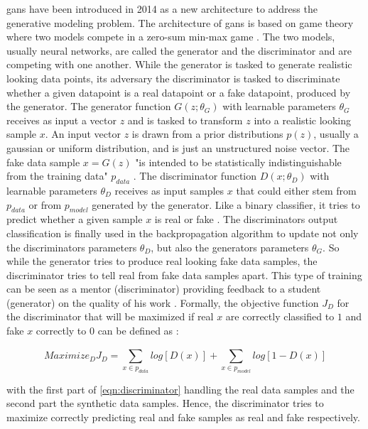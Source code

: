 \Glspl{gan} \cite{NIPS2014_5ca3e9b1} have been introduced in 2014 as a new architecture to address the generative modeling problem.
The architecture of \Glspl{gan} is based on game theory where two \glspl{model} compete in a zero-sum min-max game \cite{NIPS2014_5ca3e9b1, zhao2022CTABGANEnhancingTabular}.
The two \glspl{model}, usually neural networks, are called the generator and the discriminator and are competing with one another.
While the generator is tasked to generate realistic looking data points, its adversary the discriminator is tasked to discriminate whether a given datapoint is a real datapoint or a fake datapoint, produced by the generator.
The generator function $G(z;\theta_G)$ with learnable parameters $\theta_G$ receives as input a vector $z$ and is tasked to transform $z$ into a realistic looking sample $x$.
An input vector $z$ is drawn from a prior distributions $p(z)$, usually a gaussian or uniform distribution, and is just an unstructured noise vector.
The fake data sample $x=G(z)$ "is intended to be statistically indistinguishable from the training data" $p_{data}$ \cite[p. 141]{goodfellow2020GenerativeAdversarialNetworks}.
The discriminator function $D(x;\theta_D)$ with learnable parameters $\theta_D$ receives as input samples $x$ that could either stem from $p_{data}$ or from $p_{model}$ generated by the generator.
Like a binary classifier, it tries to predict whether a given sample $x$ is real or fake \cite{NIPS2014_5ca3e9b1}.
The discriminators output classification is finally used in the backpropagation algorithm to update not only the discriminators parameters $\theta_D$, but also the generators parameters $\theta_G$.
So while the generator tries to produce real looking fake data samples, the discriminator tries to tell real from fake data samples apart. 
This type of training can be seen as a mentor (discriminator) providing feedback to a student (generator) on the quality of his work \cite{zhao2022CTABGANEnhancingTabular}.
Formally, the objective function $J_D$ for the discriminator that will be maximized if real $x$ are correctly classified to $1$ and fake $x$ correctly to $0$ can be defined as \cite{aggarwal2018NeuralNetworksDeep}:

\begin{equation}
    \label{eqn:discriminator}
    Maximize_DJ_D= \sum_{x\in p_{data}}^{} log [D(x)] + \sum_{x\in p_{model}}^{} log [1-D(x)]
\end{equation}

with the first part of \autoref{eqn:discriminator} handling the real data samples and the second part the synthetic data samples.
Hence, the discriminator tries to maximize correctly predicting real and fake samples as real and fake respectively.

